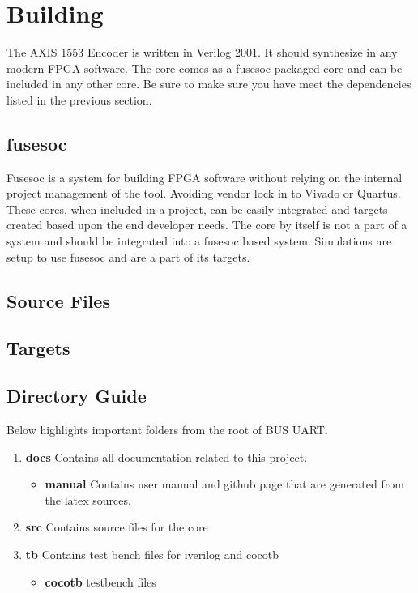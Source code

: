 \section{Building}

\par
The AXIS 1553 Encoder is written in Verilog 2001. It should synthesize in any modern FPGA software. The core comes as a fusesoc packaged core and can be
included in any other core. Be sure to make sure you have meet the dependencies listed in the previous section.

\subsection{fusesoc}
\par
Fusesoc is a system for building FPGA software without relying on the internal project management of the tool. Avoiding vendor lock in to Vivado or Quartus.
These cores, when included in a project, can be easily integrated and targets created based upon the end developer needs. The core by itself is not a part of
a system and should be integrated into a fusesoc based system. Simulations are setup to use fusesoc and are a part of its targets.

\subsection{Source Files}



\subsection{Targets}



\subsection{Directory Guide}

\par
Below highlights important folders from the root of BUS UART.

\begin{enumerate}
  \item \textbf{docs} Contains all documentation related to this project.
    \begin{itemize}
      \item \textbf{manual} Contains user manual and github page that are generated from the latex sources.
    \end{itemize}
  \item \textbf{src} Contains source files for the core
  \item \textbf{tb} Contains test bench files for iverilog and cocotb
    \begin{itemize}
      \item \textbf{cocotb} testbench files
    \end{itemize}
\end{enumerate}

